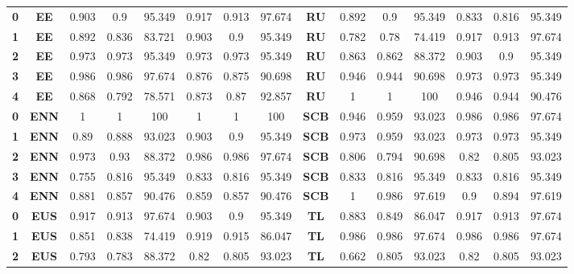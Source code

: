 {{\begin{tabular}{c|c|cccccc|ccccccc}
\textbf{0} & \textbf{EE} & 0.903 & 0.9   & 95.349 & 0.917 & 0.913 & 97.674 & \multicolumn{1}{c|}{\textbf{RU}} & 0.892 & 0.9   & 95.349 & 0.833 & 0.816 & 95.349 \\
\textbf{1} & \textbf{EE} & 0.892 & 0.836 & 83.721 & 0.903 & 0.9   & 95.349 & \multicolumn{1}{c|}{\textbf{RU}} & 0.782 & 0.78  & 74.419 & 0.917 & 0.913 & 97.674 \\
\textbf{2} & \textbf{EE} & 0.973 & 0.973 & 95.349 & 0.973 & 0.973 & 95.349 & \multicolumn{1}{c|}{\textbf{RU}} & 0.863 & 0.862 & 88.372 & 0.903 & 0.9   & 95.349 \\
\textbf{3} & \textbf{EE} & 0.986 & 0.986 & 97.674 & 0.876 & 0.875 & 90.698 & \multicolumn{1}{c|}{\textbf{RU}} & 0.946 & 0.944 & 90.698 & 0.973 & 0.973 & 95.349 \\
\textbf{4} & \textbf{EE} & 0.868 & 0.792 & 78.571 & 0.873 & 0.87  & 92.857 & \multicolumn{1}{c|}{\textbf{RU}} & 1     & 1     & 100   & 0.946 & 0.944 & 90.476 \\
\textbf{0} & \textbf{ENN} & 1     & 1     & 100   & 1     & 1     & 100   & \multicolumn{1}{c|}{\textbf{SCB}} & 0.946 & 0.959 & 93.023 & 0.986 & 0.986 & 97.674 \\
\textbf{1} & \textbf{ENN} & 0.89  & 0.888 & 93.023 & 0.903 & 0.9   & 95.349 & \multicolumn{1}{c|}{\textbf{SCB}} & 0.973 & 0.959 & 93.023 & 0.973 & 0.973 & 95.349 \\
\textbf{2} & \textbf{ENN} & 0.973 & 0.93  & 88.372 & 0.986 & 0.986 & 97.674 & \multicolumn{1}{c|}{\textbf{SCB}} & 0.806 & 0.794 & 90.698 & 0.82  & 0.805 & 93.023 \\
\textbf{3} & \textbf{ENN} & 0.755 & 0.816 & 95.349 & 0.833 & 0.816 & 95.349 & \multicolumn{1}{c|}{\textbf{SCB}} & 0.833 & 0.816 & 95.349 & 0.833 & 0.816 & 95.349 \\
\textbf{4} & \textbf{ENN} & 0.881 & 0.857 & 90.476 & 0.859 & 0.857 & 90.476 & \multicolumn{1}{c|}{\textbf{SCB}} & 1     & 0.986 & 97.619 & 0.9   & 0.894 & 97.619 \\
\textbf{0} & \textbf{EUS} & 0.917 & 0.913 & 97.674 & 0.903 & 0.9   & 95.349 & \multicolumn{1}{c|}{\textbf{TL}} & 0.883 & 0.849 & 86.047 & 0.917 & 0.913 & 97.674 \\
\textbf{1} & \textbf{EUS} & 0.851 & 0.838 & 74.419 & 0.919 & 0.915 & 86.047 & \multicolumn{1}{c|}{\textbf{TL}} & 0.986 & 0.986 & 97.674 & 0.986 & 0.986 & 97.674 \\
\textbf{2} & \textbf{EUS} & 0.793 & 0.783 & 88.372 & 0.82  & 0.805 & 93.023 & \multicolumn{1}{c|}{\textbf{TL}} & 0.662 & 0.805 & 93.023 & 0.82  & 0.805 & 93.023 \\

\end{tabular}}}
